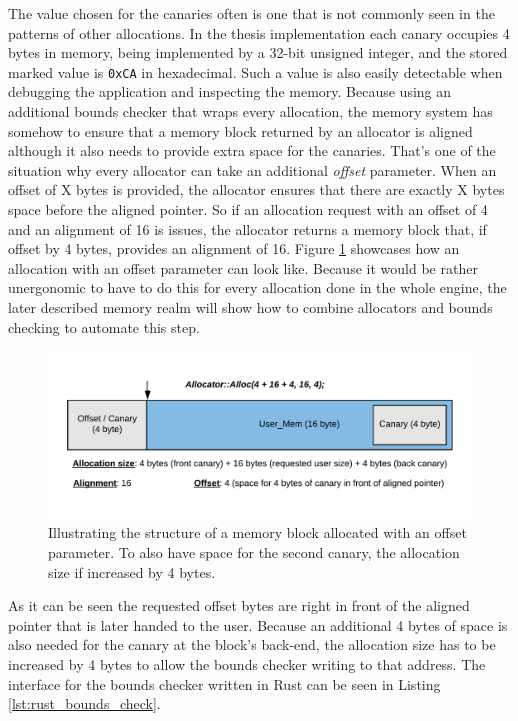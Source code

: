 \noindent
The value chosen for the canaries often is one that is not commonly seen in the patterns of other allocations. In the thesis implementation each canary occupies 4 bytes in memory, being implemented by a 32-bit unsigned integer, and the stored marked value is \texttt{0xCA} in hexadecimal. Such a value is also easily detectable when debugging the application and inspecting the memory. Because using an additional bounds checker that wraps every allocation, the memory system has somehow to ensure that a memory block returned by an allocator is aligned although it also needs to provide extra space for the canaries. That's one of the situation why every allocator can take an additional \textit{offset} parameter. When an offset of X bytes is provided, the allocator ensures that there are exactly X bytes space before the aligned pointer. So if an allocation request with an offset of 4 and an alignment of 16 is issues, the allocator returns a memory block that, if offset by 4 bytes, provides an alignment of 16. Figure \ref{fig:offset_alloc} showcases how an allocation with an offset parameter can look like. Because it would be rather unergonomic to have to do this for every allocation done in the whole engine, the later described memory realm will show how to combine allocators and bounds checking to automate this step.

\clearpage

\begin{figure}[h!]
	\centering \includegraphics[width=\linewidth]{PICs/offset_alloc.png}
	\caption{Illustrating the structure of a memory block allocated with an offset parameter. To also have space for the second canary, the allocation size if increased by 4 bytes.}
	\label{fig:offset_alloc}
\end{figure}

\noindent
As it can be seen the requested offset bytes are right in front of the aligned pointer that is later handed to the user. Because an additional 4 bytes of space is also needed for the canary at the block's back-end, the allocation size has to be increased by 4 bytes to allow the bounds checker writing to that address. The interface for the bounds checker written in Rust can be seen in Listing \ref{lst:rust_bounds_check}.\\


